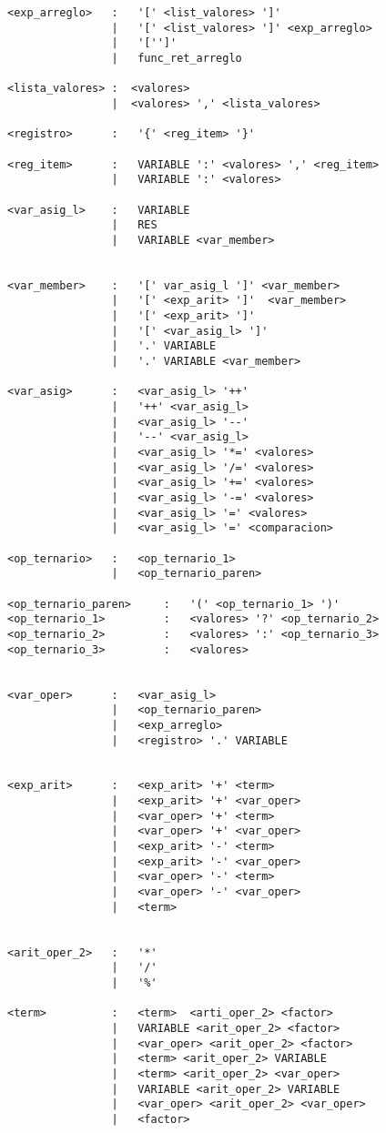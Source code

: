 \begin{verbatim}
<exp_arreglo>   :   '[' <list_valores> ']'
                |   '[' <list_valores> ']' <exp_arreglo>
                |   '['']'
                |   func_ret_arreglo

<lista_valores> :  <valores>
                |  <valores> ',' <lista_valores>

<registro>      :   '{' <reg_item> '}'

<reg_item>      :   VARIABLE ':' <valores> ',' <reg_item>
                |   VARIABLE ':' <valores> 

<var_asig_l>    :   VARIABLE
                |   RES
                |   VARIABLE <var_member>


<var_member>    :   '[' var_asig_l ']' <var_member>
                |   '[' <exp_arit> ']'  <var_member>
                |   '[' <exp_arit> ']' 
                |   '[' <var_asig_l> ']' 
                |   '.' VARIABLE 
                |   '.' VARIABLE <var_member>

<var_asig>      :   <var_asig_l> '++'
                |   '++' <var_asig_l>
                |   <var_asig_l> '--'
                |   '--' <var_asig_l>
                |   <var_asig_l> '*=' <valores>
                |   <var_asig_l> '/=' <valores>
                |   <var_asig_l> '+=' <valores>
                |   <var_asig_l> '-=' <valores>
                |   <var_asig_l> '=' <valores>
                |   <var_asig_l> '=' <comparacion>

<op_ternario>   :   <op_ternario_1>
                |   <op_ternario_paren>
                
<op_ternario_paren>     :   '(' <op_ternario_1> ')'
<op_ternario_1>         :   <valores> '?' <op_ternario_2>
<op_ternario_2>         :   <valores> ':' <op_ternario_3>
<op_ternario_3>         :   <valores>


<var_oper>      :   <var_asig_l>
                |   <op_ternario_paren>
                |   <exp_arreglo>
                |   <registro> '.' VARIABLE 

 
<exp_arit>      :   <exp_arit> '+' <term>
                |   <exp_arit> '+' <var_oper>
                |   <var_oper> '+' <term>
                |   <var_oper> '+' <var_oper>
                |   <exp_arit> '-' <term>
                |   <exp_arit> '-' <var_oper>
                |   <var_oper> '-' <term>
                |   <var_oper> '-' <var_oper>
                |   <term>


<arit_oper_2>   :   '*'
                |   '/'
                |   '%'

<term>          :   <term>  <arti_oper_2> <factor>
                |   VARIABLE <arit_oper_2> <factor>
                |   <var_oper> <arit_oper_2> <factor>
                |   <term> <arit_oper_2> VARIABLE
                |   <term> <arit_oper_2> <var_oper>
                |   VARIABLE <arit_oper_2> VARIABLE
                |   <var_oper> <arit_oper_2> <var_oper> 
                |   <factor>


\end{verbatim}
